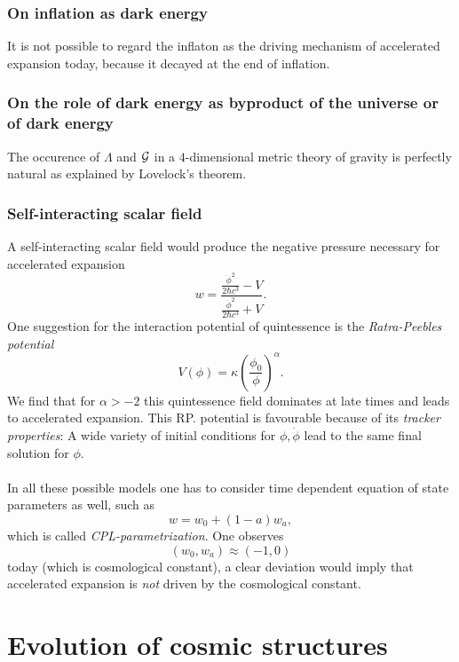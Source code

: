 \subsubsection{On inflation as dark energy}
It is not possible to regard the inflaton as the driving mechanism of accelerated expansion today, because it decayed at the end of inflation.
\subsubsection{On the role of dark energy as byproduct of the universe or of dark energy}
The occurence of $\Lambda$ and $\mathcal{G}$ in a $4$-dimensional metric theory of gravity is perfectly natural as explained by Lovelock's theorem.
\subsubsection{Self-interacting scalar field}
A self-interacting scalar field would produce the negative pressure necessary for accelerated expansion
\begin{equation}
w= \frac{\frac{\dot{\phi}^2}{2 \hbar c^3} -  V}{\frac{\dot{\phi}^2}{2 \hbar c^3} + V}.
\end{equation}
One suggestion for the interaction potential of quintessence is the \emph{Ratra-Peebles potential}
\begin{equation}
	V(\phi) = \kappa \left(\frac{\phi_0}{\phi}\right)^\alpha.
\end{equation}
We find that for $\alpha > -2$ this quintessence field dominates at late times and leads to accelerated expansion. This RP. potential is favourable because of its \emph{tracker properties}: A wide variety of initial conditions for $\phi,\dot{\phi}$ lead to the same final solution for $\phi$.\\
\\
In all these possible models one has to consider time dependent equation of state parameters as well, such as
\begin{equation}
	w=w_0 +(1-a) w_a,
\end{equation}
which is called \emph{CPL-parametrization}. One observes \begin{equation}
	(w_0,w_a) \approx (-1,0)
\end{equation}
today (which is cosmological constant), a clear deviation would imply that accelerated expansion is \emph{not} driven by the cosmological constant.


\section{Evolution of cosmic structures}

